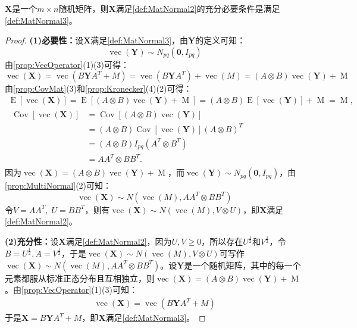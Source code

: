 \begin{theorem}
	$\mathbf{X}$是一个$m\times n$随机矩阵，则$\mathbf{X}$满足\cref{def:MatNormal2}的充分必要条件是满足\cref{def:MatNormal3}。
\end{theorem}
\begin{proof}
	\textbf{(1)必要性：}设$\mathbf{X}$满足\cref{def:MatNormal3}，由$\mathbf{Y}$的定义可知：
	\begin{equation*}
		\operatorname{vec}(\mathbf{Y})\sim N_{pq}(\mathbf{0},I_{pq})
	\end{equation*}
	由\cref{prop:VecOperator}(1)(3)可得：
	\begin{equation*}
		\operatorname{vec}(\mathbf{X})=\operatorname{vec}(B\mathbf{Y}A^T+M)=\operatorname{vec}(B\mathbf{Y}A^T)+\operatorname{vec}(M)=(A\otimes B)\operatorname{vec}(\mathbf{Y})+\operatorname{M}
	\end{equation*}
	由\cref{prop:CovMat}(3)和\cref{prop:Kronecker}(4)(2)可得：
	\begin{gather*}
		\operatorname{E}[\operatorname{vec}(\mathbf{X})] 
		= \operatorname{E}[(A \otimes B)\operatorname{vec}(\mathbf{Y}) + \operatorname{M}] 
		= (A \otimes B)\operatorname{E}[\operatorname{vec}(\mathbf{Y})] + \operatorname{M} 
		= \operatorname{M}, \\[1ex]
		\begin{aligned}
			\operatorname{Cov}[\operatorname{vec}(\mathbf{X})] 
			&= \operatorname{Cov}[(A \otimes B)\operatorname{vec}(\mathbf{Y})] \\
			&= (A \otimes B)\operatorname{Cov}[\operatorname{vec}(\mathbf{Y})](A \otimes B)^T \\
			&= (A \otimes B)I_{pq}(A^T \otimes B^T) \\
			&= AA^T \otimes BB^T.
		\end{aligned}
	\end{gather*}
	因为$\operatorname{vec}(\mathbf{X})=(A\otimes B)\operatorname{vec}(\mathbf{Y})+\operatorname{M}$，而$\operatorname{vec}(\mathbf{Y})\sim N_{pq}(\mathbf{0},I_{pq})$，由\cref{prop:MultiNormal}(2)可知：
	\begin{equation*}
		\operatorname{vec}(\mathbf{X})\sim N(\operatorname{vec}(M),AA^T\otimes BB^T)
	\end{equation*}
	令$V=AA^T,\;U=BB^T$，则有$\operatorname{vec}(\mathbf{X})\sim N(\operatorname{vec}(M),V\otimes U)$，即$\mathbf{X}$满足\cref{def:MatNormal2}。\par
	\textbf{(2)充分性：}设$\mathbf{X}$满足\cref{def:MatNormal2}，因为$U,V\geqslant0$，所以存在$U^{\frac{1}{2}}$和$V^{\frac{1}{2}}$，令$B=U^{\frac{1}{2}},A=V^{\frac{1}{2}}$，于是$\operatorname{vec}(\mathbf{X})\sim N(\operatorname{vec}(M),V\otimes U)$可写作$\operatorname{vec}(\mathbf{X})\sim N(\operatorname{vec}(M),AA^T\otimes BB^T)$。设$\mathbf{Y}$是一个随机矩阵，其中的每一个元素都服从标准正态分布且互相独立，则$\operatorname{vec}(\mathbf{X})=(A\otimes B)\operatorname{vec}(\mathbf{Y})+\operatorname{M}$。由\cref{prop:VecOperator}(1)(3)可知：
	\begin{gather*}
		\operatorname{vec}(\mathbf{X})=\operatorname{vec}(B\mathbf{Y}A^T+M)
	\end{gather*}
	于是$\mathbf{X}=B\mathbf{Y}A^T+M$，即$\mathbf{X}$满足\cref{def:MatNormal3}。
\end{proof}
